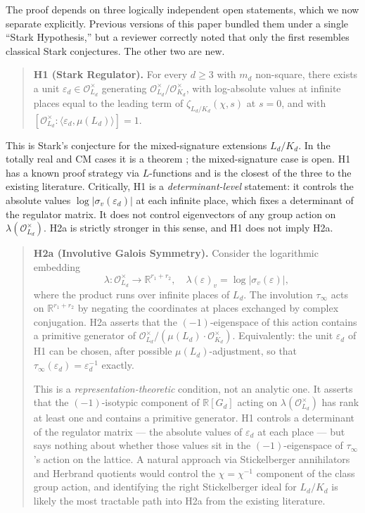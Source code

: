 \documentclass[12pt]{article}
\theoremstyle{plain}
\theoremstyle{definition}
\theoremstyle{remark}
\newcommand{\OO}{\mathcal{O}}
\newcommand{\eps}{\varepsilon}
\begin{document}
The proof depends on three logically independent open statements, which we now separate explicitly. Previous versions of this paper bundled them under a single ``Stark Hypothesis,'' but a reviewer correctly noted that only the first resembles classical Stark conjectures. The other two are new.

\begin{quote}
\textbf{H1 (Stark Regulator).} For every $d \geq 3$ with $m_d$ non-square, there exists a unit $\eps_d \in \OO_{L_d}^\times$ generating $\OO_{L_d}^\times / \OO_{K_d}^\times$, with log-absolute values at infinite places equal to the leading term of $\zeta_{L_d/K_d}(\chi, s)$ at $s = 0$, and with $[\OO_{L_d}^\times : \langle \eps_d, \mu(L_d) \rangle] = 1$.
\end{quote}

This is Stark's conjecture \cite{stark1971} for the mixed-signature extensions $L_d / K_d$. In the totally real and CM cases it is a theorem \cite{tate1984}; the mixed-signature case is open. H1 has a known proof strategy via $L$-functions and is the closest of the three to the existing literature. Critically, H1 is a \emph{determinant-level} statement: it controls the absolute values $\log|\sigma_v(\eps_d)|$ at each infinite place, which fixes a determinant of the regulator matrix. It does not control eigenvectors of any group action on $\lambda(\OO_{L_d}^\times)$. H2a is strictly stronger in this sense, and H1 does not imply H2a.

\begin{quote}
\textbf{H2a (Involutive Galois Symmetry).} Consider the logarithmic embedding
\[
  \lambda : \OO_{L_d}^\times \to \mathbb{R}^{r_1+r_2}, \quad \lambda(\eps)_v = \log|\sigma_v(\eps)|,
\]
where the product runs over infinite places of $L_d$. The involution $\tau_\infty$ acts on $\mathbb{R}^{r_1+r_2}$ by negating the coordinates at places exchanged by complex conjugation. H2a asserts that the $(-1)$-eigenspace of this action contains a primitive generator of $\OO_{L_d}^\times / (\mu(L_d) \cdot \OO_{K_d}^\times)$. Equivalently: the unit $\eps_d$ of H1 can be chosen, after possible $\mu(L_d)$-adjustment, so that $\tau_\infty(\eps_d) = \eps_d^{-1}$ exactly.

This is a \emph{representation-theoretic} condition, not an analytic one. It asserts that the $(-1)$-isotypic component of $\mathbb{R}[G_d]$ acting on $\lambda(\OO_{L_d}^\times)$ has rank at least one and contains a primitive generator. H1 controls a determinant of the regulator matrix — the absolute values of $\eps_d$ at each place — but says nothing about whether those values sit in the $(-1)$-eigenspace of $\tau_\infty$'s action on the lattice. A natural approach via Stickelberger annihilators and Herbrand quotients would control the $\chi = \chi^{-1}$ component of the class group action, and identifying the right Stickelberger ideal for $L_d / K_d$ is likely the most tractable path into H2a from the existing literature.
\end{quote}
\end{document}
